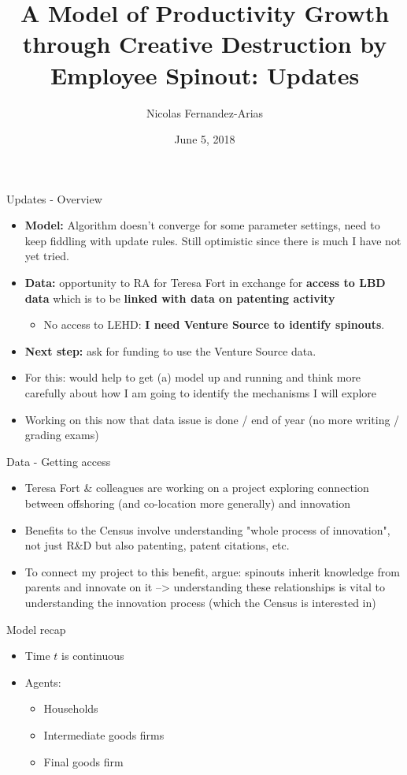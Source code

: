 \documentclass[english,usenames,dvipsnames]{beamer}
\title{A Model of Productivity Growth through Creative Destruction by Employee Spinout: Updates}
\author{Nicolas Fernandez-Arias}
\date[June 5, 2018]{June 5, 2018}
\begin{document}
	  
\frame{\titlepage}

\begin{frame}{Updates - Overview}
\begin{itemize}
	\item \textbf{Model:} Algorithm doesn't converge for some parameter settings, need to keep fiddling with update rules. Still optimistic since there is much I have not yet tried. 
	\item \textbf{Data:} opportunity to RA for Teresa Fort in exchange for \textbf{access to LBD data} which is to be \textbf{linked with data on patenting activity}
	\begin{itemize}
		\item No access to LEHD: \textbf{I need Venture Source to identify spinouts}. 
	\end{itemize}
	\item \textbf{Next step:} ask for funding to use the Venture Source data. 
	\item For this: would help to get (a) model up and running and think more carefully about how I am going to identify the mechanisms I will explore
	\item Working on this now that data issue is done / end of year (no more writing / grading exams)
\end{itemize}
\end{frame}

\begin{frame}{Data - Getting access}
\begin{itemize}
	\item Teresa Fort \& colleagues are working on a project exploring connection between offshoring (and co-location more generally) and innovation
	\item Benefits to the Census involve understanding "whole process of innovation", not just R\&D but also patenting, patent citations, etc.
	\item To connect my project to this benefit, argue: spinouts inherit knowledge from parents and innovate on it --> understanding these relationships is vital to understanding the innovation process (which the Census is interested in)
\end{itemize}
\end{frame}



\begin{frame}{Model recap}
\begin{itemize}
	\item Time $t$ is continuous 
	\item Agents:
	\begin{itemize}
		\item Households 
		\item Intermediate goods firms
		\item Final goods firm 
	\end{itemize}
\end{itemize} 
\end{frame}
\end{document}
